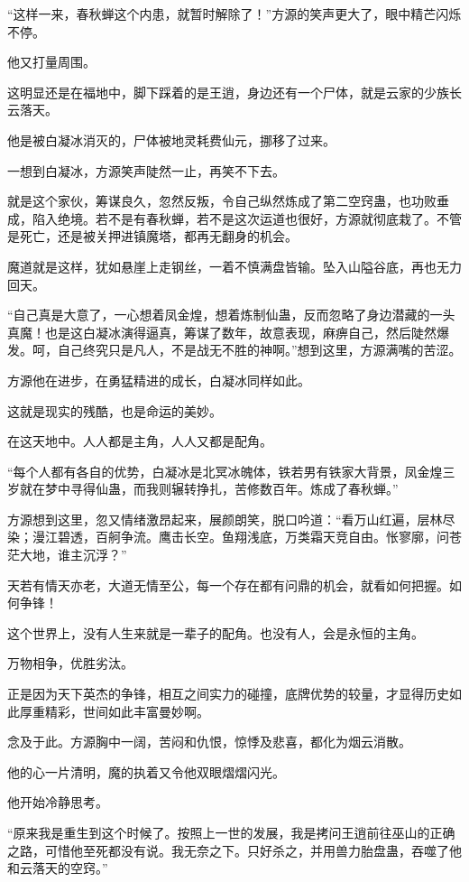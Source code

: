 \begin{this_body}
“这样一来，春秋蝉这个内患，就暂时解除了！”方源的笑声更大了，眼中精芒闪烁不停。

他又打量周围。

这明显还是在福地中，脚下踩着的是王逍，身边还有一个尸体，就是云家的少族长云落天。

他是被白凝冰消灭的，尸体被地灵耗费仙元，挪移了过来。

一想到白凝冰，方源笑声陡然一止，再笑不下去。

就是这个家伙，筹谋良久，忽然反叛，令自己纵然炼成了第二空窍蛊，也功败垂成，陷入绝境。若不是有春秋蝉，若不是这次运道也很好，方源就彻底栽了。不管是死亡，还是被关押进镇魔塔，都再无翻身的机会。

魔道就是这样，犹如悬崖上走钢丝，一着不慎满盘皆输。坠入山隘谷底，再也无力回天。

“自己真是大意了，一心想着凤金煌，想着炼制仙蛊，反而忽略了身边潜藏的一头真魔！也是这白凝冰演得逼真，筹谋了数年，故意表现，麻痹自己，然后陡然爆发。呵，自己终究只是凡人，不是战无不胜的神啊。”想到这里，方源满嘴的苦涩。

方源他在进步，在勇猛精进的成长，白凝冰同样如此。

这就是现实的残酷，也是命运的美妙。

在这天地中。人人都是主角，人人又都是配角。

“每个人都有各自的优势，白凝冰是北冥冰魄体，铁若男有铁家大背景，凤金煌三岁就在梦中寻得仙蛊，而我则辗转挣扎，苦修数百年。炼成了春秋蝉。”

方源想到这里，忽又情绪激昂起来，展颜朗笑，脱口吟道：“看万山红遍，层林尽染；漫江碧透，百舸争流。鹰击长空。鱼翔浅底，万类霜天竞自由。怅寥廓，问苍茫大地，谁主沉浮？”

天若有情天亦老，大道无情至公，每一个存在都有问鼎的机会，就看如何把握。如何争锋！

这个世界上，没有人生来就是一辈子的配角。也没有人，会是永恒的主角。

万物相争，优胜劣汰。

正是因为天下英杰的争锋，相互之间实力的碰撞，底牌优势的较量，才显得历史如此厚重精彩，世间如此丰富曼妙啊。

念及于此。方源胸中一阔，苦闷和仇恨，惊悸及悲喜，都化为烟云消散。

他的心一片清明，魔的执着又令他双眼熠熠闪光。

他开始冷静思考。

“原来我是重生到这个时候了。按照上一世的发展，我是拷问王逍前往巫山的正确之路，可惜他至死都没有说。我无奈之下。只好杀之，并用兽力胎盘蛊，吞噬了他和云落天的空窍。”


\end{this_body}
